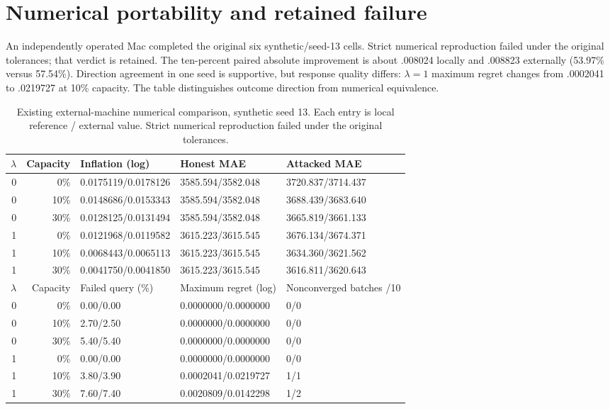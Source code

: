 \documentclass[11pt]{article}
\begin{document}
\section{Numerical portability and retained failure}
An independently operated Mac completed the original six synthetic/seed-13
cells. Strict numerical reproduction failed under the original tolerances;
that verdict is retained. The ten-percent paired absolute improvement is
about .008024 locally and .008823 externally (53.97\% versus 57.54\%).
Direction agreement in one seed is supportive, but response quality differs:
$\lambda=1$ maximum regret changes from .0002041 to .0219727 at 10\% capacity.
The table distinguishes outcome direction from numerical equivalence.
\begin{table}[htbp]
\centering\small
\caption{Existing external-machine numerical comparison, synthetic seed 13. Each entry is local reference / external value. Strict numerical reproduction failed under the original tolerances.}
\label{tab:external-numerical}
\begin{tabular}{rrlll}
\toprule $\lambda$ & Capacity & Inflation (log) & Honest MAE & Attacked MAE\\\midrule
0 & 0\% & 0.0175119/0.0178126 & 3585.594/3582.048 & 3720.837/3714.437\\
0 & 10\% & 0.0148686/0.0153343 & 3585.594/3582.048 & 3688.439/3683.640\\
0 & 30\% & 0.0128125/0.0131494 & 3585.594/3582.048 & 3665.819/3661.133\\
1 & 0\% & 0.0121968/0.0119582 & 3615.223/3615.545 & 3676.134/3674.371\\
1 & 10\% & 0.0068443/0.0065113 & 3615.223/3615.545 & 3634.360/3621.562\\
1 & 30\% & 0.0041750/0.0041850 & 3615.223/3615.545 & 3616.811/3620.643\\
\midrule $\lambda$ & Capacity & Failed query (\%) & Maximum regret (log) & Nonconverged batches /10\\\midrule
0 & 0\% & 0.00/0.00 & 0.0000000/0.0000000 & 0/0\\
0 & 10\% & 2.70/2.50 & 0.0000000/0.0000000 & 0/0\\
0 & 30\% & 5.40/5.40 & 0.0000000/0.0000000 & 0/0\\
1 & 0\% & 0.00/0.00 & 0.0000000/0.0000000 & 0/0\\
1 & 10\% & 3.80/3.90 & 0.0002041/0.0219727 & 1/1\\
1 & 30\% & 7.60/7.40 & 0.0020809/0.0142298 & 1/2\\
\bottomrule\end{tabular}
\end{table}
\end{document}
